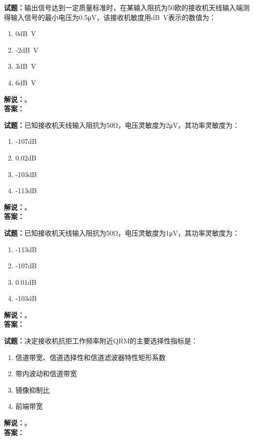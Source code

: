 \documentclass{ctexbook}
\begin{document}
\bigskip

\noindent\textbf{试题：}输出信号达到一定质量标准时，在某输入阻抗为50欧的接收机天线输入端测得输入信号的最小电压为0.5μV，该接收机敏度用\unit[qualifier-mode=combine]{\deci\bel{}}V表示的数值为：
\begin{enumerate}[leftmargin=3em]
  \item 0\unit[qualifier-mode=combine]{\deci\bel{}}V
  \item -2\unit[qualifier-mode=combine]{\deci\bel{}}V
  \item 3\unit[qualifier-mode=combine]{\deci\bel{}}V
  \item 6\unit[qualifier-mode=combine]{\deci\bel{}}V
\end{enumerate}
\noindent\textbf{解说：}\textbf{}。\\\noindent\textbf{答案：}

\bigskip

\noindent\textbf{试题：}已知接收机天线输入阻抗为50Ω，电压灵敏度为2μV，其功率灵敏度为：
\begin{enumerate}[leftmargin=3em]
  \item -107\unit[qualifier-mode=combine]{\deci\bel{}}
  \item 0.02\unit[qualifier-mode=combine]{\deci\bel{}}
  \item -103\unit[qualifier-mode=combine]{\deci\bel{}}
  \item -113\unit[qualifier-mode=combine]{\deci\bel{}}
\end{enumerate}
\noindent\textbf{解说：}\textbf{}。\\\noindent\textbf{答案：}

\bigskip

\noindent\textbf{试题：}已知接收机天线输入阻抗为50Ω，电压灵敏度为1μV，其功率灵敏度为：
\begin{enumerate}[leftmargin=3em]
  \item -113\unit[qualifier-mode=combine]{\deci\bel{}}
  \item -107\unit[qualifier-mode=combine]{\deci\bel{}}
  \item 0.01\unit[qualifier-mode=combine]{\deci\bel{}}
  \item -103\unit[qualifier-mode=combine]{\deci\bel{}}
\end{enumerate}
\noindent\textbf{解说：}\textbf{}。\\\noindent\textbf{答案：}

\bigskip

\noindent\textbf{试题：}决定接收机抗拒工作频率附近QRM的主要选择性指标是：
\begin{enumerate}[leftmargin=3em]
  \item 信道带宽、信道选择性和信道滤波器特性矩形系数
  \item 带内波动和信道带宽
  \item 镜像抑制比
  \item 前端带宽
\end{enumerate}
\noindent\textbf{解说：}\textbf{}。\\\noindent\textbf{答案：}
\end{document}
